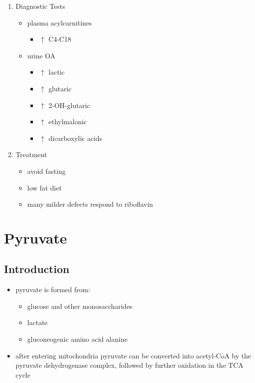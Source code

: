 \documentclass{scrartcl}
\begin{document}
\begin{enumerate}
\item Diagnostic Tests
\label{sec:org9f743f6}
\begin{itemize}
\item plasma acylcarnitines
\begin{itemize}
\item \(\uparrow\) C4-C18
\end{itemize}
\item urine OA
\begin{itemize}
\item \(\uparrow\) lactic
\item \(\uparrow\) glutaric
\item \(\uparrow\) 2-OH-glutaric
\item \(\uparrow\) ethylmalonic
\item \(\uparrow\) dicarboxylic acids
\end{itemize}
\end{itemize}
\item Treatment
\label{sec:orgc7300df}
\begin{itemize}
\item avoid fasting
\item low fat diet
\item many milder defects respond to riboflavin
\end{itemize}
\end{enumerate}
\section{Pyruvate}
\label{sec:org04f7ec4}
\subsection{Introduction}
\label{sec:org25571b1}
\begin{itemize}
\item pyruvate is formed from:
\begin{itemize}
\item glucose and other monosaccharides
\item lactate
\item gluconeogenic amino acid alanine
\end{itemize}
\item after entering mitochondria pyruvate can be converted into
acetyl-CoA by the pyruvate dehydrogenase complex, followed by
further oxidation in the TCA cycle
\end{itemize}

\begin{center}
\setatomsep{1.8em}
\hspace{20}
\end{center}
\end{document}
